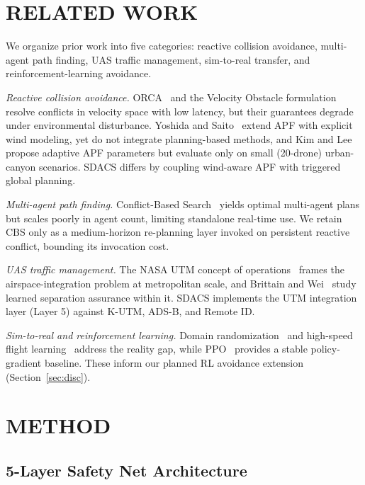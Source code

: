 \documentclass[letterpaper, 10pt, conference]{ieeeconf}
\begin{document}
\section{RELATED WORK}

We organize prior work into five categories: reactive collision
avoidance, multi-agent path finding, UAS traffic management,
sim-to-real transfer, and reinforcement-learning avoidance.

\textit{Reactive collision avoidance.} ORCA~\cite{vandenberg2011orca}
and the Velocity Obstacle formulation~\cite{fiorini1998vo} resolve
conflicts in velocity space with low latency, but their guarantees
degrade under environmental disturbance.
Yoshida and Saito~\cite{yoshida2023apf_wind} extend APF with explicit
wind modeling, yet do not integrate planning-based methods, and
Kim and Lee~\cite{kim2024urban_apf} propose adaptive APF parameters
but evaluate only on small (20-drone) urban-canyon scenarios. SDACS
differs by coupling wind-aware APF with triggered global planning.

\textit{Multi-agent path finding.} Conflict-Based
Search~\cite{sharon2015cbs} yields optimal multi-agent plans but
scales poorly in agent count, limiting standalone real-time use.
We retain CBS only as a medium-horizon re-planning layer invoked on
persistent reactive conflict, bounding its invocation cost.

\textit{UAS traffic management.} The NASA UTM concept of
operations~\cite{kopardekar2017utm} frames the airspace-integration
problem at metropolitan scale, and Brittain and Wei~\cite{brittain2021utm}
study learned separation assurance within it. SDACS implements the
UTM integration layer (Layer 5) against K-UTM, ADS-B, and Remote ID.

\textit{Sim-to-real and reinforcement learning.} Domain
randomization~\cite{tobin2017dr} and high-speed flight
learning~\cite{loquercio2021flight} address the reality gap, while
PPO~\cite{schulman2017ppo} provides a stable policy-gradient baseline.
These inform our planned RL avoidance extension (Section~\ref{sec:disc}).

\section{METHOD}

\subsection{5-Layer Safety Net Architecture}
\end{document}
